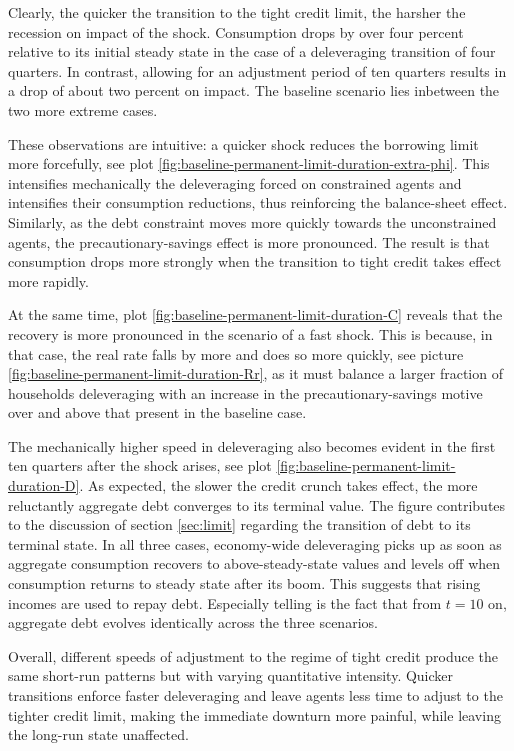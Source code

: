 \documentclass[a4paper,12pt]{article} %
\numberwithin{equation}{section} %
\numberwithin{figure}{section}
\numberwithin{table}{section}
\begin{document}
Clearly, the quicker the transition to the tight credit limit, the harsher the recession on impact of the shock. Consumption drops by over four percent relative to its initial steady state in the case of a deleveraging transition of four quarters. In contrast, allowing for an adjustment period of ten quarters results in a drop of about two percent on impact. The baseline scenario lies inbetween the two more extreme cases. 

These observations are intuitive: a quicker shock reduces the borrowing limit more forcefully, see plot \ref{fig:baseline-permanent-limit-duration-extra-phi}. This intensifies mechanically the deleveraging forced on constrained agents and intensifies their consumption reductions, thus reinforcing the balance-sheet effect. Similarly, as the debt constraint moves more quickly towards the unconstrained agents, the precautionary-savings effect is more pronounced. The result is that consumption drops more strongly when the transition to tight credit takes effect more rapidly. 

At the same time, plot \ref{fig:baseline-permanent-limit-duration-C} reveals that the recovery is more pronounced in the scenario of a fast shock. This is because, in that case, the real rate falls by more and does so more quickly, see picture \ref{fig:baseline-permanent-limit-duration-Rr}, as it must balance a larger fraction of households deleveraging with an increase in the precautionary-savings motive over and above that present in the baseline case.

The mechanically higher speed in deleveraging also becomes evident in the first ten quarters after the shock arises, see plot \ref{fig:baseline-permanent-limit-duration-D}. As expected, the slower the credit crunch takes effect, the more reluctantly aggregate debt converges to its terminal value. The figure contributes to the discussion of section \ref{sec:limit} regarding the transition of debt to its terminal state. In all three cases, economy-wide deleveraging picks up as soon as aggregate consumption recovers to above-steady-state values and levels off when consumption returns to steady state after its boom. This suggests that rising incomes are used to repay debt. Especially telling is the fact that from $t=10$ on, aggregate debt evolves identically across the three scenarios.

Overall, different speeds of adjustment to the regime of tight credit produce the same short-run patterns but with varying quantitative intensity. Quicker transitions enforce faster deleveraging and leave agents less time to adjust to the tighter credit limit, making the immediate downturn more painful, while leaving the long-run state unaffected.
\end{document}
